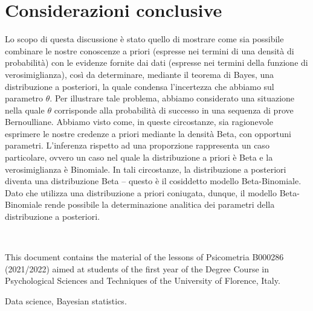 \documentclass[
  10pt,
  italian,
  a4paper,
  extrafontsizes,onecolumn,openright
  ]{memoir}
\makeatletter
\newcommand{\MemoirChapStyle}{daleif1}
\newcommand{\MemoirPageStyle}{Ruled}
\newlength\widthw %
\newcommand*{\SmallMargins}{
  \setlrmarginsandblock{1.5in}{1.5in}{*}
  \setmarginnotes{0.1in}{0.1in}{0.1in}
 \setulmarginsandblock{1.5in}{1in}{*}
  \checkandfixthelayout
  \ch@ngetext
  \clearpage
  \setlength{\widthw}{\textwidth+\marginparsep+\marginparwidth}
  \footnotesatfoot
  \chapterstyle{\MemoirChapStyle}  %
  \pagestyle{\MemoirPageStyle}
}
\newcommand{\LargeMargins}{\SmallMargins}
\newcommand{\evenpage}{
  \clearpage
  \strictpagecheck %
  \checkoddpage
  \ifoddpage
    \thispagestyle{empty}
    ~\\ %
    \newpage
  \else
  \fi
}
\theoremstyle{definition}
\theoremstyle{definition}
\theoremstyle{definition}
\theoremstyle{definition}
\theoremstyle{remark}
\makeatother
\begin{document}
\hypertarget{considerazioni-conclusive}{%
\section*{Considerazioni conclusive}\label{considerazioni-conclusive}}

Lo scopo di questa discussione è stato quello di mostrare come sia possibile combinare le nostre conoscenze a priori (espresse nei termini di una densità di probabilità) con le evidenze fornite dai dati (espresse nei termini della funzione di verosimiglianza), così da determinare, mediante il teorema di Bayes, una distribuzione a posteriori, la quale condensa l'incertezza che abbiamo sul parametro \(\theta\). Per illustrare tale problema, abbiamo considerato una situazione nella quale \(\theta\) corrisponde alla probabilità di successo in una sequenza di prove Bernoulliane. Abbiamo visto come, in queste circostanze, sia ragionevole esprimere le nostre credenze a priori mediante la densità Beta, con opportuni parametri. L'inferenza rispetto ad una proporzione rappresenta un caso particolare, ovvero un caso nel quale la distribuzione a priori è Beta e la verosimiglianza è Binomiale. In tali circostanze, la distribuzione a posteriori diventa una distribuzione Beta -- questo è il cosiddetto modello Beta-Binomiale. Dato che utilizza una distribuzione a priori coniugata, dunque, il modello Beta-Binomiale rende possibile la determinazione analitica dei parametri della distribuzione a posteriori.



\backmatter
\SmallMargins

\printbibliography
\onecolumn




\cleardoublepage
\LargeMargins
\listoffigures







\evenpage
\SmallMargins
\thispagestyle{empty}

\begin{normalsize}

\begin{description}

\item[Abstract]
This document contains the material of the lessons of Psicometria B000286 (2021/2022) aimed at students of the first year of the Degree Course in Psychological Sciences and Techniques of the University of Florence, Italy.
\item[Keywords]
Data science, Bayesian statistics.
~\\

\end{description}

\end{normalsize}
\end{document}
